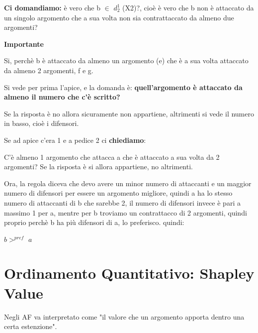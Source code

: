 \vspace{0.4cm}

\textbf{Ci domandiamo:} è vero che b $\in$ $d^1_2$ (X2)?, cioè è vero che b non è attaccato da un singolo argomento che a sua volta non sia contrattaccato da almeno due argomenti?
\begin{center}
    \textbf{Importante}
\end{center}
Si, perchè b è attaccato da almeno un argomento (e) che è a sua volta attaccato da almeno 2 argomenti, f e g.

\vspace{0.3cm}

Si vede per prima l’apice, e la domanda è: \textbf{quell’argomento è attaccato da almeno il numero che c’è scritto?}

\vspace{0.3cm}

Se la risposta è no allora sicuramente non appartiene, altrimenti si vede il numero in basso, cioè i difensori. 

\newpage
Se ad apice c’era 1 e a pedice 2 ci \textbf{chiediamo}:

\vspace{0.3cm}

C’è almeno 1 argomento che attacca a che è attaccato a sua volta da 2 argomenti? Se la risposta è si allora appartiene, no altrimenti.

\vspace{0.3cm}

Ora, la regola diceva che devo avere un minor numero di attaccanti e un maggior numero di difensori per essere un argomento migliore, quindi a ha lo stesso numero di attaccanti di b che sarebbe 2, il numero di difensori invece è pari a massimo 1 per a, mentre per b troviamo un contrattacco di 2
argomenti, quindi proprio perchè b ha più difensori di a, lo preferisco. quindi:
\begin{center}
    $b >^{pref}$ $a$
\end{center}
\section{Ordinamento Quantitativo: Shapley Value}
Negli AF va interpretato come "il valore che un argomento apporta dentro una certa estenzione".
